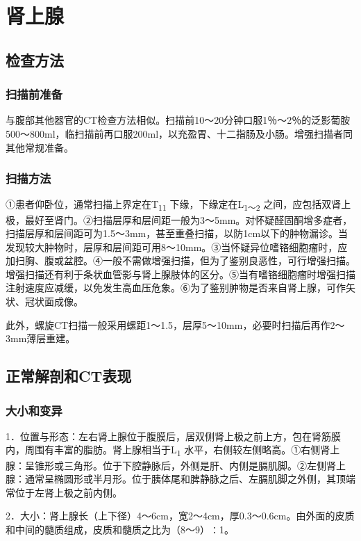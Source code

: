 \chapter{肾上腺}

\section{检查方法}

\subsection{扫描前准备}

与腹部其他器官的CT检查方法相似。扫描前10～20分钟口服1％～2％的泛影葡胺500～800ml，临扫描前再口服200ml，以充盈胃、十二指肠及小肠。增强扫描者同其他常规准备。

\subsection{扫描方法}

①患者仰卧位，通常扫描上界定在T\textsubscript{11}
下缘，下缘定在L\textsubscript{1～2}
之间，应包括双肾上极，最好至肾门。②扫描层厚和层间距一般为3～5mm。对怀疑醛固酮增多症者，扫描层厚和层间距可为1.5～3mm，甚至重叠扫描，以防1cm以下的肿物漏诊。当发现较大肿物时，层厚和层间距可用8～10mm。③当怀疑异位嗜铬细胞瘤时，应加扫胸、腹或盆腔。④一般不需做增强扫描，但为了鉴别良恶性，可行增强扫描。增强扫描还有利于条状血管影与肾上腺肢体的区分。⑤当有嗜铬细胞瘤时增强扫描注射速度应减缓，以免发生高血压危象。⑥为了鉴别肿物是否来自肾上腺，可作矢状、冠状面成像。

此外，螺旋CT扫描一般采用螺距1～1.5，层厚5～10mm，必要时扫描后再作2～3mm薄层重建。

\section{正常解剖和CT表现}

\subsection{大小和变异}

1．位置与形态：左右肾上腺位于腹膜后，居双侧肾上极之前上方，包在肾筋膜内，周围有丰富的脂肪。肾上腺相当于L\textsubscript{1}
水平，右侧较左侧略高。①右侧肾上腺：呈锥形或三角形。位于下腔静脉后，外侧是肝、内侧是膈肌脚。②左侧肾上腺：通常呈椭圆形或半月形。位于胰体尾和脾静脉之后、左膈肌脚之外侧，其顶端常位于左肾上极之前内侧。

2．大小：肾上腺长（上下径）4～6cm，宽2～4cm，厚0.3～0.6cm。由外面的皮质和中间的髓质组成，皮质和髓质之比为（8～9）∶1。

